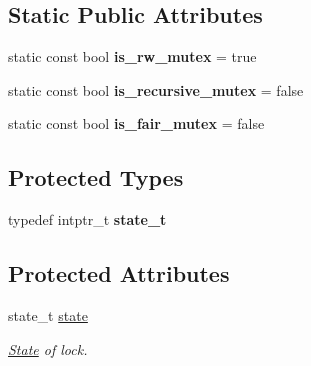 \subsection*{Static Public Attributes}
\begin{DoxyCompactItemize}
\item 
\hypertarget{classtbb_1_1spin__rw__mutex__v3_addc8223faacc1bb2cc8626b609ab2c49}{}static const bool {\bfseries is\+\_\+rw\+\_\+mutex} = true\label{classtbb_1_1spin__rw__mutex__v3_addc8223faacc1bb2cc8626b609ab2c49}

\item 
\hypertarget{classtbb_1_1spin__rw__mutex__v3_a7f6aa8fe3e9c7c4ee4cdec6d221ffe45}{}static const bool {\bfseries is\+\_\+recursive\+\_\+mutex} = false\label{classtbb_1_1spin__rw__mutex__v3_a7f6aa8fe3e9c7c4ee4cdec6d221ffe45}

\item 
\hypertarget{classtbb_1_1spin__rw__mutex__v3_affd403f6e3822589e985a2c23505fbd1}{}static const bool {\bfseries is\+\_\+fair\+\_\+mutex} = false\label{classtbb_1_1spin__rw__mutex__v3_affd403f6e3822589e985a2c23505fbd1}

\end{DoxyCompactItemize}
\subsection*{Protected Types}
\begin{DoxyCompactItemize}
\item 
\hypertarget{classtbb_1_1spin__rw__mutex__v3_a27adc7d791dfaa4a60638313b9d1c1f4}{}typedef intptr\+\_\+t {\bfseries state\+\_\+t}\label{classtbb_1_1spin__rw__mutex__v3_a27adc7d791dfaa4a60638313b9d1c1f4}

\end{DoxyCompactItemize}
\subsection*{Protected Attributes}
\begin{DoxyCompactItemize}
\item 
state\+\_\+t \hyperlink{classtbb_1_1spin__rw__mutex__v3_aa28625051072472ccd8a2b19405d6fb3}{state}
\begin{DoxyCompactList}\small\item\em \hyperlink{structState}{State} of lock. \end{DoxyCompactList}\end{DoxyCompactItemize}

